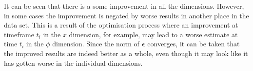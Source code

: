 





It can be seen that there is a some improvement in all the dimensions. However, in some cases the improvement is negated by worse results in another place in the data set. This is a result of the optimisation process where an improvement at timeframe $t_i$ in the $x$ dimension, for example, may lead to a worse estimate at time $t_i$ in the $\phi$ dimension. Since the norm of $\bm{\epsilon}$ converges, it can be taken that the improved results are indeed better as a whole, even though it may look like it has gotten worse in the individual dimensions.


